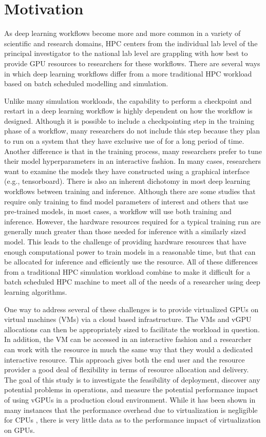 \documentclass[acmtog, authorversion]{acmart}
\begin{document}
\section{Motivation}\label{sec:motive}
As deep learning workflows become more and more common in a variety of scientific and research domains, HPC centers from the individual lab level of the principal investigator to the national lab level are grappling with how best to provide GPU resources to researchers for these workflows. There are several ways in which deep learning workflows differ from a more traditional HPC workload based on batch scheduled modelling and simulation. 

Unlike many simulation workloads, the capability to perform a checkpoint and restart in a deep learning workflow is highly dependent on how the  workflow is designed. Although it is possible to include a checkpointing step in the training phase of a workflow, many researchers do not include this step because they plan to run on a system that they have exclusive use of for a long period of time. Another difference is that in the training process, many researchers prefer to tune their model hyperparameters in an interactive fashion. In many cases, researchers want to examine the models they have constructed using a graphical interface (e.g., tensorboard). There is also an inherent dichotomy in most deep learning workflows between training and inference. Although there are some studies that require only training to find model parameters of interest and others that use pre-trained models, in most cases, a workflow will use both training and inference. However, the hardware resources required for a typical training run are generally much greater than those needed for inference with a similarly sized model. This leads to the challenge of providing hardware resources that have enough computational power to train models in a reasonable time, but that can be allocated for inference and efficiently use the resource. All of these differences from a traditional HPC simulation workload combine to make it difficult for a batch scheduled HPC machine to meet all of the needs of a researcher using deep learning algorithms.  

One way to address several of these challenges is to provide virtualized GPUs on virtual machines (VMs) via a cloud based infrastructure. The VMs and vGPU allocations can then be appropriately sized to facilitate the workload in question. In addition, the VM can be accessed in an interactive fashion and a researcher can work with the resource in much the same way that they would a dedicated interactive resource. This approach gives both the end user and the resource provider a good deal of flexibility in terms of resource allocation and delivery. The goal of this study is to investigate the feasibility of deployment, discover any potential problems in operations, and measure the potential performance impact of using vGPUs in a production cloud environment. While it has been shown in many instances that the performance overhead due to virtualization is negligible for CPUs \cite{}, there is very little data as to the performance impact of virtualization on GPUs. 
\end{document}
